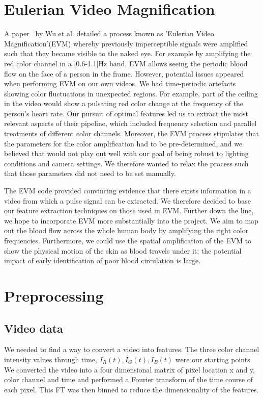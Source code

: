 \documentclass[12pt]{article}
\begin{document}
\section{Eulerian Video Magnification}

A paper~\cite{Wu12Eulerian} by Wu et al. detailed a process known as 'Eulerian Video Magnification'(EVM) whereby previously imperceptible signals were amplified such that they became visible to the naked eye. For example by amplifying the red color channel in a [0.6-1.1]Hz band, EVM allows seeing the periodic blood flow on the face of a person in the frame.
However, potential issues appeared when performing EVM on our own videos. We had time-periodic artefacts showing color fluctuations in unexpected regions. For example, part of the ceiling in the video would show a pulsating red color change at the frequency of the person's heart rate. Our pursuit of optimal features led us to extract the most relevant aspects of their pipeline, which included frequency selection and parallel treatments of different color channels. Moreover, the EVM process stipulates that the parameters for the color amplification had to be pre-determined, and we believed that would not play out well with our goal of being robust to lighting conditions and camera settings. We therefore wanted to relax the process such that those parameters did not need to be set manually.

The EVM code provided convincing evidence that there exists information in a video from which a pulse signal can be extracted. We therefore decided to base our feature extraction techniques on those used in EVM. Further down the line, we hope to incorporate EVM more substantially into the project. We aim to map out the blood flow across the whole human body by amplifying the right color frequencies. Furthermore, we could use the spatial amplification of the EVM to show the physical motion of the skin as blood travels under it; the potential impact of early identification of poor blood circulation is large.


\section{Preprocessing}
\subsection*{Video data}
  We needed to find a way to convert a video into features.
  The three color channel intensity values through time, \(I_R(t), I_G(t), I_B(t)\) were our starting points.
  We converted the video into a four dimensional matrix of pixel location x and y, color channel and time and performed a Fourier transform of the time course of each pixel.
  This FT was then binned to reduce the dimensionality of the features.
  
\end{document}
